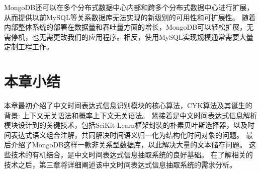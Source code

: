 MongoDB还可以在多个分布式数据中心内部和跨多个分布式数据中心进行扩展，从而提供以前MySQL等关系数据库无法实现的新级别的可用性和可扩展性。
随着内部整体系统的部署在数据量和吞吐量方面的增长，MongoDB可以轻松扩展，无需停机，也无需更改我们的应用程序。相反，使用MySQL实现规模通常需要大量定制工程工作。

\section{本章小结}

本章最初介绍了中文时间表达式信息识别模块的核心算法，CYK算法及其诞生的背景: 上下文无关语法和概率上下文无关语法。
紧接着是中文时间表达式信息解析模块设计到的关键技术，包括SciKit-Learn框架封装的朴素贝叶斯选择器，以及时间表达式语义组合注解，共同解决时间语义归一化为结构化时间对象的问题。
最后介绍了MongoDB这样一款非关系型数据库，以此解决大量的文本储存问题。 这些技术的有机结合，是中文时间表达式信息抽取系统的良好基础。
在了解相关的技术之后，第三章将详细阐述该中文时间表达式信息抽取系统的需求分析。
